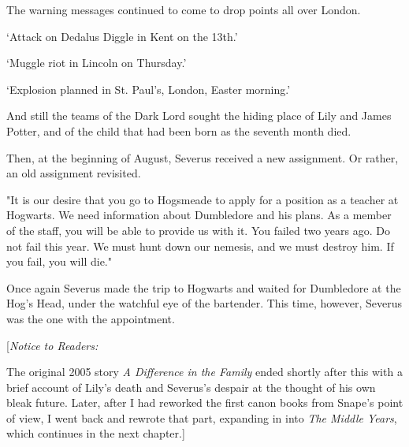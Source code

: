 The warning messages continued to come to drop points all over London.

`Attack on Dedalus Diggle in Kent on the 13th.'

`Muggle riot in Lincoln on Thursday.'

`Explosion planned in St. Paul's, London, Easter morning.'

And still the teams of the Dark Lord sought the hiding place of Lily and James Potter, and of the child that had been born as the seventh month died.

Then, at the beginning of August, Severus received a new assignment. Or rather, an old assignment revisited.

"It is our desire that you go to Hogsmeade to apply for a position as a teacher at Hogwarts. We need information about Dumbledore and his plans. As a member of the staff, you will be able to provide us with it. You failed two years ago. Do not fail this year. We must hunt down our nemesis, and we must destroy him. If you fail, you will die."

Once again Severus made the trip to Hogwarts and waited for Dumbledore at the Hog's Head, under the watchful eye of the bartender. This time, however, Severus was the one with the appointment.

[\emph{Notice to Readers:}

The original 2005 story \emph{A Difference in the Family }ended shortly after this with a brief account of Lily's death and Severus's despair at the thought of his own bleak future. Later, after I had reworked the first canon books from Snape's point of view, I went back and rewrote that part, expanding in into \emph{The Middle Years}, which continues in the next chapter.]


